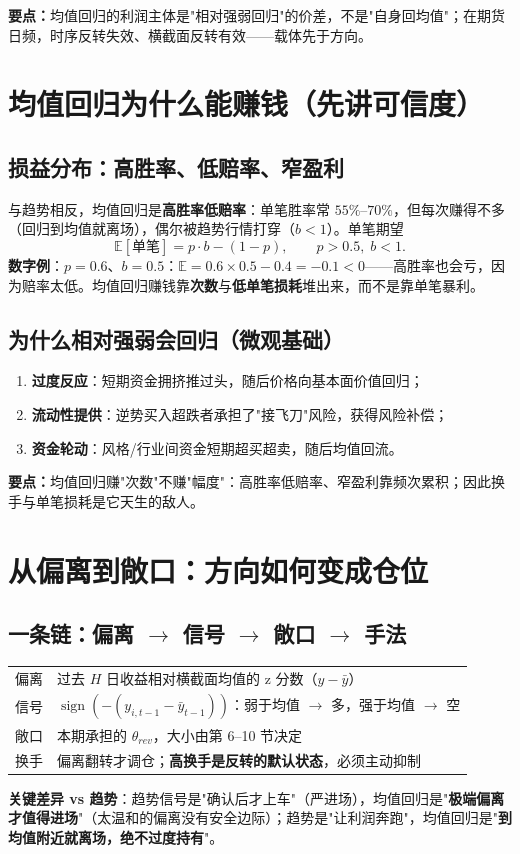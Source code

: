 \documentclass[UTF8,11pt]{ctexart}
\newcommand{\takeaway}[1]{\medskip\par\noindent\textbf{要点：}#1\par\medskip}
\begin{document}
\takeaway{均值回归的利润主体是"相对强弱回归"的价差，不是"自身回均值"；在期货日频，时序反转失效、横截面反转有效——载体先于方向。}

\section{均值回归为什么能赚钱（先讲可信度）}
\subsection{损益分布：高胜率、低赔率、窄盈利}
与趋势相反，均值回归是\textbf{高胜率低赔率}：单笔胜率常 $55\%$--$70\%$，但每次赚得不多（回归到均值就离场），偶尔被趋势行情打穿（$b<1$）。单笔期望
\begin{equation}
\mathbb{E}[\text{单笔}] = p\cdot b - (1-p),\qquad p>0.5,\; b<1.
\end{equation}
\textbf{数字例}：$p=0.6$、$b=0.5$：$\mathbb{E}=0.6\times0.5-0.4=-0.1<0$——高胜率也会亏，因为赔率太低。均值回归赚钱靠\textbf{次数}与\textbf{低单笔损耗}堆出来，而不是靠单笔暴利。
\subsection{为什么相对强弱会回归（微观基础）}
\begin{enumerate}[itemsep=2pt]
\item \textbf{过度反应}：短期资金拥挤推过头，随后价格向基本面价值回归；
\item \textbf{流动性提供}：逆势买入超跌者承担了"接飞刀"风险，获得风险补偿；
\item \textbf{资金轮动}：风格/行业间资金短期超买超卖，随后均值回流。
\end{enumerate}

\takeaway{均值回归赚"次数"不赚"幅度"：高胜率低赔率、窄盈利靠频次累积；因此换手与单笔损耗是它天生的敌人。}

\section{从偏离到敞口：方向如何变成仓位}
\subsection{一条链：偏离 $\to$ 信号 $\to$ 敞口 $\to$ 手法}
\begin{center}
\renewcommand{\arraystretch}{1.35}
\begin{tabular}{@{}l>{\raggedright\arraybackslash}p{4.6cm}@{}}
\midrule
偏离 & 过去 $H$ 日收益相对横截面均值的 z 分数（$y-\bar y$） \\
信号 & $\operatorname{sign}(-(y_{i,t-1}-\bar y_{t-1}))$：弱于均值 $\to$ 多，强于均值 $\to$ 空 \\
敞口 & 本期承担的 $\theta_{rev}$，大小由第 6--10 节决定 \\
换手 & 偏离翻转才调仓；\textbf{高换手是反转的默认状态}，必须主动抑制 \\
\bottomrule
\end{tabular}
\end{center}
\textbf{关键差异 vs 趋势}：趋势信号是"确认后才上车"（严进场），均值回归是"\textbf{极端偏离才值得进场}"（太温和的偏离没有安全边际）；趋势是"让利润奔跑"，均值回归是"\textbf{到均值附近就离场，绝不过度持有}"。
\end{document}
